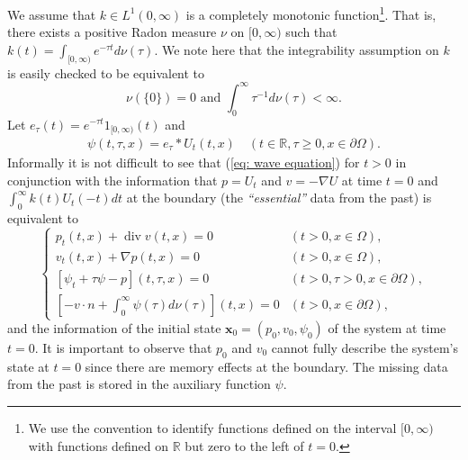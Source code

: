 \documentclass{amsart}
\newcommand{\xnice}{\mathbf{x}}
\newcommand{\R}{\mathbb{R}}
\DeclareMathOperator{\Div}{div}
\begin{document}
We assume that $k\in L^1(0,\infty)$ is a completely monotonic function\footnote{We use the convention to identify functions defined on the interval $[0,\infty)$ with functions defined on $\R$ but zero to the left of $t=0$.}. That is, there exists a positive Radon measure $\nu$ on $[0,\infty)$ such that $k(t)=\int_{[0,\infty)}e^{-\tau t} d\nu(\tau)$. We note here that the integrability assumption on $k$ is easily checked to be equivalent to 
\begin{equation}\label{eq: k is integrable}
 \nu(\{0\})=0 \text{ and } \int_0^{\infty}\tau^{-1} d\nu(\tau)<\infty.
\end{equation}
Let $e_{\tau}(t)=e^{-\tau t} 1_{[0,\infty)}(t)$ and
\begin{align*}
 \psi(t,\tau,x) = e_{\tau} * U_t(t,x) \quad (t\in\R, \tau\geq0, x\in\partial\Omega) .
\end{align*}
Informally it is not difficult to see that (\ref{eq: wave equation}) for $t>0$ in conjunction with the information that $p=U_t$ and $v=-\nabla U$ at time $t=0$ and $\int_0^{\infty}k(t)U_t(-t)dt$ at the boundary (the \emph{``essential''} data from the past) is equivalent to
\begin{equation}\label{eq: physical wave equation}
 \begin{cases}
  p_t(t,x) + \Div v(t,x) = 0 &  (t>0, x\in\Omega), \\
  v_t(t,x) + \nabla p(t,x) = 0 & (t>0, x\in\Omega), \\
  [\psi_t+\tau\psi-p](t,\tau,x) = 0 & (t>0, \tau>0, x\in\partial\Omega), \\
  \left[-v\cdot n + \int_0^{\infty} \psi(\tau) d\nu(\tau)\right](t,x) = 0 & (t>0, x\in\partial\Omega),
 \end{cases}
\end{equation}
and the information of the initial state $\xnice_0=(p_0, v_0, \psi_0)$ of the system at time $t=0$. It is important to observe that $p_0$ and $v_0$ cannot fully describe the system's state at $t=0$ since there are memory effects at the boundary. The missing data from the past is stored in the auxiliary function $\psi$.
\end{document}
